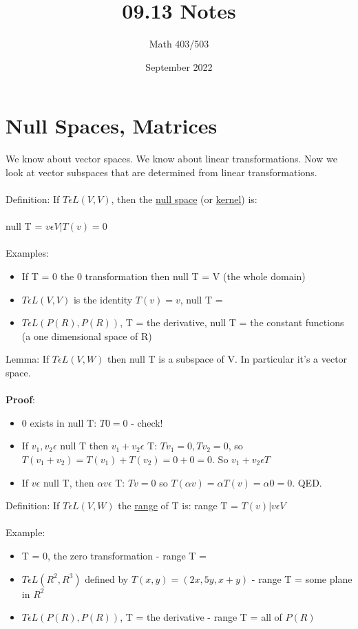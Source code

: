 \documentclass{article}
\title{09.13 Notes}
\author{Math 403/503 }
\date{September 2022}
\begin{document}
\maketitle

\section{Null Spaces, Matrices}

We know about vector spaces. We know about linear transformations. Now we look at vector subspaces that are determined from linear transformations. \\\\
Definition: If $T \epsilon L(V,V)$, then the \underline{null space} (or \underline{kernel}) is: \\\\
{null T = \textbraceleft $v \epsilon V | T(v) = 0$\textbraceright} \\\\
Examples: 
\begin{itemize}
\item If T = 0 the 0 transformation then null T = V (the whole domain)
\item $T \epsilon L(V,V)$ is the identity $T(v) = v$, null T = \textbraceright
\item $T\epsilon L(P(R), P(R))$, T = the derivative, null T = the constant functions (a one dimensional space of R)

\end{itemize}
Lemma: If $T\epsilon L(V,W)$ then null T is a subspace of V. In particular it's a vector space. \\\\
\textbf{Proof}: 
\begin{itemize} 
\item 0 exists in null T: $T0 = 0$ - check! 
\item If $v_1, v_2 \epsilon$ null T then $v_1 + v_2 \epsilon $ T: $Tv_1 = 0, Tv_2 = 0$, so $T(v_1 + v_2) = T(v_1) + T(v_2) = 0 + 0 = 0$. So $v_1 + v_2 \epsilon T$ 
\item If $v \epsilon $ null T, then $\alpha v \epsilon $ T: $Tv = 0$ so $T(\alpha v) = \alpha T(v) = \alpha 0 = 0$. QED.

\end{itemize}
Definition: If $T \epsilon L(V,W)$ the \underline{range} of T is: range T = \textbraceleft $T(v) | v\epsilon V$\textbraceright \\\\
Example: 
\begin{itemize}
\item T = 0, the zero transformation - range T = \textbraceright
\item $T \epsilon L(R^2, R^3)$ defined by $T(x,y) = (2x, 5y, x+y)$ - range T = some plane in $R^2$
\item $T \epsilon L(P(R), P(R))$, T = the derivative - range T = all of $P(R)$

\end{itemize}
\end{document}
